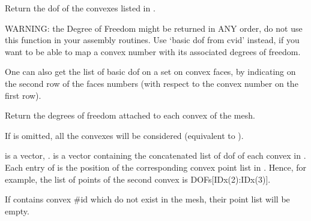 \documentclass[a4paper,11pt,english]{sphinxmanual}
\begin{document}
\begin{fulllineitems}

\begin{fulllineitems}
\label{\detokenize{python/cmdref_MeshFem:getfem.MeshFem.basic_dof_from_cv}}
Return the dof of the convexes listed in .

WARNING: the Degree of Freedom might be returned in ANY order, do
not use this function in your assembly routines. Use ‘basic dof from cvid’
instead, if you want to be able to map a convex number with its
associated degrees of freedom.

One can also get the list of basic dof on a set on convex faces, by
indicating on the second row of  the faces numbers (with
respect to the convex number on the first row).

\end{fulllineitems}


\begin{fulllineitems}
\label{\detokenize{python/cmdref_MeshFem:getfem.MeshFem.basic_dof_from_cvid}}
Return the degrees of freedom attached to each convex of the mesh.

If  is omitted, all the convexes will be considered (equivalent
to ).

 is a vector, .
 is a vector containing the concatenated list
of dof of each convex in . Each entry of  is the position
of the corresponding convex point list in . Hence, for example,
the list of points of the second convex is DOFs{[}IDx(2):IDx(3){]}.

If  contains convex \#id which do not exist in the mesh, their
point list will be empty.

\end{fulllineitems}



\end{fulllineitems}
\end{document}
